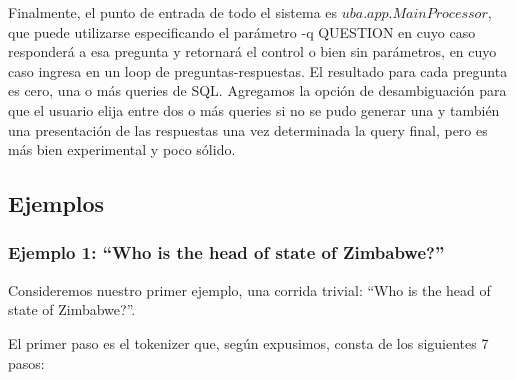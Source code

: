 Finalmente, el punto de entrada de todo el sistema es $uba.app.MainProcessor$, que puede utilizarse especificando el parámetro -q QUESTION en cuyo caso responderá a esa pregunta y retornará el control o bien sin parámetros, en cuyo caso ingresa en un loop de preguntas-respuestas. El resultado para cada pregunta es cero, una o más queries de SQL.
Agregamos la opción de desambiguación para que el usuario elija entre dos o más queries si no se pudo generar una y también una presentación de las respuestas una vez determinada la query final, pero es más bien experimental y poco sólido.

\subsection{Ejemplos}
\label{subsec:popescu-ejemplos}

\subsubsection*{Ejemplo 1: ``Who is the head of state of Zimbabwe?''}

Consideremos nuestro primer ejemplo, una corrida trivial: ``Who is the head of state of Zimbabwe?''.

El primer paso es el tokenizer que, según expusimos, consta de los siguientes 7 pasos:

